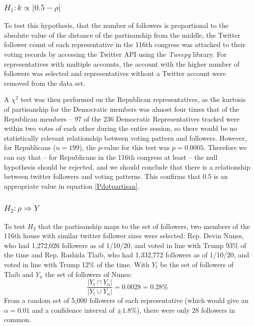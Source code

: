 \documentclass[NETN,manuscript]{stjour-new}
\begin{document}
\subsubsection{$H_1: k \propto |0.5 - \rho|$} 
To test this hypothesis, that the number of followers is proportional to the absolute value of the distance of the partisanship from the middle, the Twitter follower count of each representative in the 116th congress was attached to their voting records by accessing the Twitter API using the \textit{Tweepy} library. For representatives with multiple accounts, the account with the higher number of followers was selected and representatives without a Twitter account were removed from the data set. 

A $\chi^2$ test was then performed on the Republican representatives, as the kurtosis of partisanship for the Democratic members was almost four times that of the Republican members -- 97 of the 236 Democratic Representatives tracked were within two votes of each other during the entire session, so there would be no statistically relevant relationship between voting pattern and followers. However, for Republicans ($n = 199$), the $p$-value for this test was $p=0.0005$. Therefore we can say that -- for Republicans in the 116th congress at least -- the null hypothesis should be rejected, and we should conclude that there is a relationship between twitter followers and voting patterns. This confirms that 0.5 is an appropriate value in equation \ref{Pdotpartisan}.


\subsubsection{$H_2: \rho \Rightarrow Y$}
To test $H_2$ that the partisanship maps to the set of followers, two members of the 116th house with similar twitter follower sizes were selected: Rep. Devin Nunes, who had 1,272,026 followers as of 1/10/20, and voted in line with Trump 93\% of the time and Rep. Rashida Tlaib, who had 1,332,772 followers as of 1/10/20, and voted in line with Trump 12\% of the time. With $Y_t$ be the set of followers of Tlaib and $Y_n$ the set of followers of Nunes: 
\begin{equation}
\frac{|Y_t \cap Y_n|}{|Y_t \cup Y_n|} = 0.0028 = 0.28\%
\end{equation}
From a random set of 5,000 followers of each representative (which would give an $\alpha = 0.01$ and a confidence interval of $\pm 1.8\%$), there were only 28 followers in common.
\end{document}

